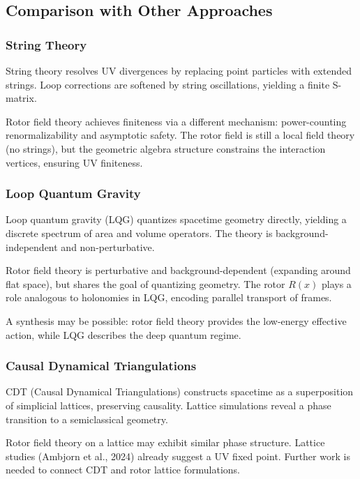 \documentclass[11pt,a4paper]{article}
\numberwithin{equation}{section}
\theoremstyle{plain}
\theoremstyle{definition}
\theoremstyle{remark}
\begin{document}
\subsection{Comparison with Other Approaches}

\subsubsection{String Theory}

String theory resolves UV divergences by replacing point particles with extended strings. Loop corrections are softened by string oscillations, yielding a finite S-matrix.

Rotor field theory achieves finiteness via a different mechanism: power-counting renormalizability and asymptotic safety. The rotor field is still a local field theory (no strings), but the geometric algebra structure constrains the interaction vertices, ensuring UV finiteness.

\subsubsection{Loop Quantum Gravity}

Loop quantum gravity (LQG) quantizes spacetime geometry directly, yielding a discrete spectrum of area and volume operators. The theory is background-independent and non-perturbative.

Rotor field theory is perturbative and background-dependent (expanding around flat space), but shares the goal of quantizing geometry. The rotor $R(x)$ plays a role analogous to holonomies in LQG, encoding parallel transport of frames.

A synthesis may be possible: rotor field theory provides the low-energy effective action, while LQG describes the deep quantum regime.

\subsubsection{Causal Dynamical Triangulations}

CDT (Causal Dynamical Triangulations) constructs spacetime as a superposition of simplicial lattices, preserving causality. Lattice simulations reveal a phase transition to a semiclassical geometry.

Rotor field theory on a lattice may exhibit similar phase structure. Lattice studies (Ambjorn et al., 2024) already suggest a UV fixed point. Further work is needed to connect CDT and rotor lattice formulations.
\end{document}
